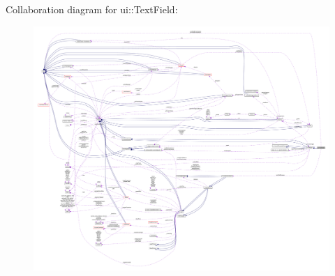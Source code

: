 Collaboration diagram for ui\+:\+:Text\+Field\+:
\nopagebreak
\begin{figure}[H]
\begin{center}
\leavevmode
\includegraphics[width=350pt]{classui_1_1TextField__coll__graph}
\end{center}
\end{figure}
